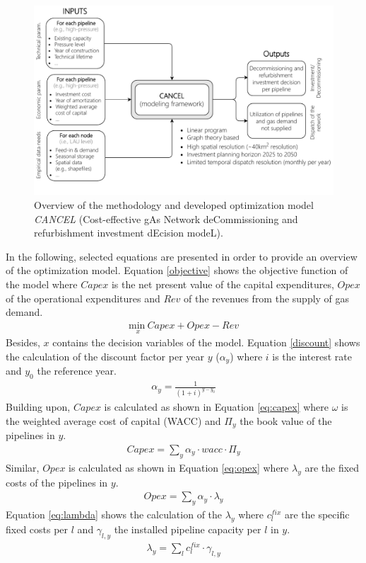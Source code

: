 \documentclass[review]{elsarticle}
\begin{document}
 \begin{figure}[h]
	\centering
	\includegraphics[width=1\linewidth]{flowchart.pdf}
	\caption{Overview of the methodology and developed optimization model \textit{CANCEL} (Cost-effective gAs Network deCommissioning and refurbishment investment dEcision modeL).}
	\label{fig:methodology}
\end{figure}

In the following, selected equations are presented in order to provide an overview of the optimization model. Equation \ref{objective} shows the objective function of the model where $Capex$ is the net present value of the capital expenditures, $Opex$ of the operational expenditures and $Rev$ of the revenues from the supply of gas demand. 
\begin{align}\label{objective}
	\underset{x}{\mathrm{min~}} Capex + Opex - Rev
\end{align}
Besides, $x$ contains the decision variables of the model. Equation \ref{discount} shows the calculation of the discount factor per year $y$ ($\alpha_y$) where $i$ is the interest rate and $y_0$ the reference year. 
\begin{align}\label{discount}
	\alpha_y = \frac{1}{(1+i)^{y-y_0}}
\end{align}
Building upon, $Capex$ is calculated as shown in Equation \ref{eq:capex} where $\omega$ is the weighted average cost of capital (WACC) and $\Pi_y$ the book value of the pipelines in $y$.
\begin{align}\label{eq:capex}
	Capex = \sum_{y} \alpha_y \cdot wacc \cdot \Pi_y
\end{align}
Similar, $Opex$ is calculated as shown in Equation \ref{eq:opex} where $\lambda_y$ are the fixed costs of the pipelines in $y$. 
\begin{align}\label{eq:opex}
	Opex = \sum_{y} \alpha_y \cdot \lambda_y
\end{align}
Equation \ref{eq:lambda} shows the calculation of the $\lambda_y$ where $c^{fix}_{l}$ are the specific fixed costs per $l$ and $\gamma_{l, y}$ the installed pipeline capacity per $l$ in $y$.
\begin{align}\label{eq:lambda}
	\lambda_y = \sum_{l} c^{fix}_{l} \cdot \gamma_{l, y}
\end{align}
\end{document}
